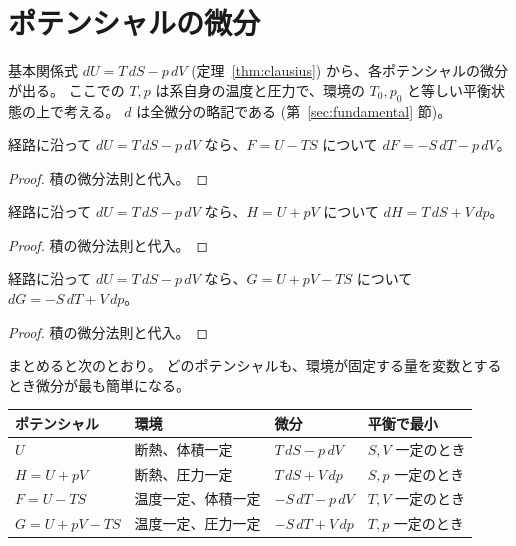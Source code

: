 \section{ポテンシャルの微分}

基本関係式 $dU = T\,dS - p\,dV$ (定理~\ref{thm:clausius}) から、各ポテンシャルの微分が出る。
ここでの $T, p$ は系自身の温度と圧力で、環境の $T_0, p_0$ と等しい平衡状態の上で考える。
$d$ は全微分の略記である (第~\ref{sec:fundamental} 節)。

\begin{theorem}[$dF = -S\,dT - p\,dV$]
  \label{thm:dF}
  \leanok
  経路に沿って $dU = T\,dS - p\,dV$ なら、$F = U - TS$ について $dF = -S\,dT - p\,dV$。
\end{theorem}

\begin{proof}
  \leanok
  積の微分法則と代入。
\end{proof}

\begin{theorem}[$dH = T\,dS + V\,dp$]
  \label{thm:dH}
  \leanok
  経路に沿って $dU = T\,dS - p\,dV$ なら、$H = U + pV$ について $dH = T\,dS + V\,dp$。
\end{theorem}

\begin{proof}
  \leanok
  積の微分法則と代入。
\end{proof}

\begin{theorem}[$dG = -S\,dT + V\,dp$]
  \label{thm:dG}
  \leanok
  経路に沿って $dU = T\,dS - p\,dV$ なら、$G = U + pV - TS$ について $dG = -S\,dT + V\,dp$。
\end{theorem}

\begin{proof}
  \leanok
  積の微分法則と代入。
\end{proof}

まとめると次のとおり。
どのポテンシャルも、環境が固定する量を変数とするとき微分が最も簡単になる。

\begin{center}
\begin{tabular}{llll}
  ポテンシャル & 環境 & 微分 & 平衡で最小 \\
  \hline
  $U$ & 断熱、体積一定 & $T\,dS - p\,dV$ & $S, V$ 一定のとき \\
  $H = U + pV$ & 断熱、圧力一定 & $T\,dS + V\,dp$ & $S, p$ 一定のとき \\
  $F = U - TS$ & 温度一定、体積一定 & $-S\,dT - p\,dV$ & $T, V$ 一定のとき \\
  $G = U + pV - TS$ & 温度一定、圧力一定 & $-S\,dT + V\,dp$ & $T, p$ 一定のとき \\
\end{tabular}
\end{center}

